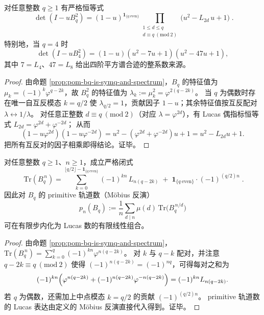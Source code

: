 \begin{theorem}\label{thm:pom-bq-lucas-square-spectrum-factorization}
对任意整数 \(q\ge 1\) 有严格恒等式
\[
\boxed{\;
\det(I-uB_q^2)
=(1-u)^{\mathbf 1_{\{q\ \mathrm{even}\}}}
\prod_{\substack{1\le d\le q\\ d\equiv q\ (\mathrm{mod}\ 2)}}
\bigl(u^2-L_{2d}\,u+1\bigr)\; } .
\]
特别地，当 \(q=4\) 时
\[
\det(I-uB_4^2)=(1-u)(u^2-7u+1)(u^2-47u+1),
\]
其中 \(7=L_4\)、\(47=L_8\) 给出四阶平方谱合迹的整系数来源。
\end{theorem}
\begin{proof}
由命题 \ref{prop:pom-bq-is-symq-and-spectrum}，\(B_q\) 的特征值为 \(\mu_k=(-1)^k\varphi^{q-2k}\)，故 \(B_q^2\) 的特征值为 \(\lambda_k:=\mu_k^2=\varphi^{2(q-2k)}\)。
当 \(q\) 为偶数时存在唯一自互反模态 \(k=q/2\) 使 \(\lambda_{q/2}=1\)，贡献因子 \(1-u\)；其余特征值按互反配对 \(\lambda\leftrightarrow 1/\lambda\)。
对任意正整数 \(d\equiv q\ (\mathrm{mod}\ 2)\)（对应 \(\lambda=\varphi^{2d}\)），有 Lucas 偶指标恒等式
\(
L_{2d}=\varphi^{2d}+\varphi^{-2d}
\)；
从而
\[
(1-u\varphi^{2d})(1-u\varphi^{-2d})=u^2-(\varphi^{2d}+\varphi^{-2d})u+1=u^2-L_{2d}u+1.
\]
把所有互反对的因子相乘即得结论。证毕。
\end{proof}

\begin{theorem}\label{thm:pom-bq-trace-lucas}
对任意整数 \(q\ge 1\)、\(n\ge 1\)，成立严格闭式
\[
\boxed{\;
\mathrm{Tr}(B_q^{\,n})
=
\sum_{k=0}^{\lfloor q/2\rfloor-\mathbf 1_{\{q\ \mathrm{even}\}}}
(-1)^{kn}\,L_{n(q-2k)}
\;+\;
\mathbf 1_{\{q\ \mathrm{even}\}}\cdot (-1)^{(q/2)n}\; } .
\]
因此对 \(B_q\) 的 primitive 轨道数（Möbius 反演）
\[
p_n(B_q):=\frac{1}{n}\sum_{d\mid n}\mu(d)\,\mathrm{Tr}\!\bigl(B_q^{\,n/d}\bigr)
\]
可在有限步内化为 Lucas 数的有限线性组合。
\end{theorem}
\begin{proof}
由命题 \ref{prop:pom-bq-is-symq-and-spectrum}，
\(
\mathrm{Tr}(B_q^{\,n})=\sum_{k=0}^{q}(-1)^{kn}\varphi^{n(q-2k)}
\)。
对 \(k\) 与 \(q-k\) 配对，并注意 \(q-2k\equiv q\ (\mathrm{mod}\ 2)\) 使得 \((-1)^{n(q-2k)}=(-1)^{nq}\)，可得每对之和为
\[
(-1)^{kn}\Bigl(\varphi^{n(q-2k)}+(-1)^{n(q-2k)}\varphi^{-n(q-2k)}\Bigr)=(-1)^{kn}L_{n(q-2k)}.
\]
若 \(q\) 为偶数，还需加上中点模态 \(k=q/2\) 的贡献 \((-1)^{(q/2)n}\)。
primitive 轨道数的 Lucas 表达由定义的 Möbius 反演直接代入得到。证毕。
\end{proof}

